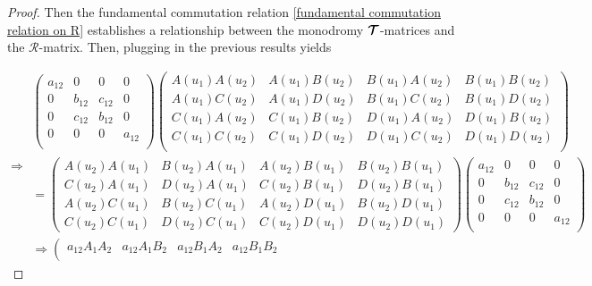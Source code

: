 \documentclass{homework}
\begin{document}
\begin{proof}
Then the fundamental commutation relation \eqref{fundamental commutation relation on R} establishes a relationship between the monodromy $\bm{\mathcal{T}}$-matrices and the $\bm{\mathcal{R}}$-matrix. Then, plugging in the previous results yields

\begin{equation*}
    \Rightarrow \begin{split}
    \left(\begin{array}{cccc}
        a_{12} & 0 & 0 & 0  \\
        0 & b_{12} & c_{12} & 0  \\
        0 & c_{12} & b_{12} & 0  \\
        0 & 0 & 0 & a_{12} \\
    \end{array} \right) \left( \begin{array}{cccc}
        A(u_1) A(u_2) & A(u_1) B(u_2) & B(u_1) A(u_2) & B(u_1) B(u_2)  \\
        A(u_1) C(u_2) & A(u_1) D(u_2) & B(u_1) C(u_2) & B(u_1) D(u_2) \\
        C(u_1) A(u_2) & C(u_1) B(u_2) & D(u_1) A(u_2) & D(u_1) B(u_2) \\
        C(u_1) C(u_2) & C(u_1) D(u_2) & D(u_1) C(u_2) & D(u_1) D(u_2) \\
    \end{array} \right) \\ = \left( \begin{array}{cccc}
        A(u_2) A(u_1) & B(u_2)A(u_1) & A(u_2) B(u_1) & B(u_2) B(u_1)  \\
        C(u_2) A(u_1) & D(u_2) A(u_1) & C(u_2) B(u_1) & D(u_2) B(u_1) \\ 
        A(u_2) C(u_1) & B(u_2) C(u_1) & A(u_2) D(u_1) & B(u_2) D(u_1) \\ 
        C(u_2) C(u_1) & D(u_2) C(u_1) & C(u_2) D(u_1) & D(u_2) D(u_1) 
    \end{array} \right) \left(\begin{array}{cccc}
        a_{12} & 0 & 0 & 0  \\
        0 & b_{12} & c_{12} & 0  \\
        0 & c_{12} & b_{12} & 0  \\
        0 & 0 & 0 & a_{12} \\
    \end{array} \right) \\
   \Rightarrow 
   \left(\begin{array}{cccc}
        a_{12} A_1 A_2 & a_{12} A_1 B_2 & a_{12} B_1 A_2 & a_{12} B_1 B_2 \\

\end{array}
\end{split}
\end{equation*}
\end{proof}
\end{document}
